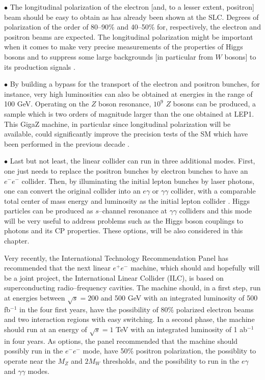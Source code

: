 $\bullet$ The longitudinal polarization of the electron [and, to a lesser
extent, positron] beam should be easy to obtain as has already been shown at
the SLC. Degrees of polarization of the order of 80--90\% and 40--50\% for,
respectively, the electron and positron beams are expected. The longitudinal
polarization might be important when it comes to make very precise measurements
of the properties of Higgs bosons and to suppress some large backgrounds [in
particular from $W$ bosons] to its production signals \cite{LC-polarization}. \s

$\bullet$ By building a bypass for the transport of the electron and positron
bunches, for instance, very high luminosities can also be obtained at energies
in the range of 100 GeV. Operating on the $Z$ boson resonance, $10^{9}$ $Z$
bosons can be produced, a sample which is two orders of magnitude larger than
the one obtained at LEP1. This GigaZ machine, in particular since longitudinal
polarization will be available, could significantly improve the precision tests
of the SM which have been performed in the previous decade \cite{LC-GigaZ}. \s

$\bullet$ Last but not least, the linear collider can run in three additional
modes. First, one just needs to replace the positron bunches by electron
bunches to have an $e^- e^-$ collider. Then, by illuminating the initial lepton
bunches by laser photons, one can convert the original collider into an $e
\gamma$ or $\gamma \gamma$ collider, with a  comparable total center of mass
energy and luminosity as the initial lepton collider
\cite{gamma-machine1,gamma-machine2}. Higgs particles can be produced as
$s$--channel resonance  at $\gamma \gamma$ colliders
\cite{gamma-Rev-old,gamma-Rev-TESLA,gamma-Rev-NLC,gamma-Jose} and this mode
will be very useful to address problems such as the Higgs boson couplings to
photons and its CP properties. These options, will be also considered in this
chapter. \s


Very recently, the International Technology Recommendation Panel has
recommended \cite{Technology-choice} that the next linear $e^+e^-$ machine,
which should and hopefully will be a joint project, the International Linear
Collider (ILC), is based on superconducting radio--frequency cavities. The
machine should, in a first step, run at energies between $\sqrt{s}=200$ and 500
GeV with an integrated luminosity of 500 fb$^{-1}$ in the four first years,
have the possibility of 80\% polarized electron beams and two interaction
regions with easy switching.  In a second phase, the machine should run at an
energy of $\sqrt{s}=1$ TeV with an integrated luminosity of 1 ab$^{-1}$ in four
years. As options, the panel recommended that the machine should possibly run
in the $e^- e^-$ mode, have 50\% positron polarization, the possiblity to
operate near the $M_Z$ and $2M_W$ thresholds, and  the possibility to run in
the $e\gamma$ and $\gamma \gamma$ modes. \s

